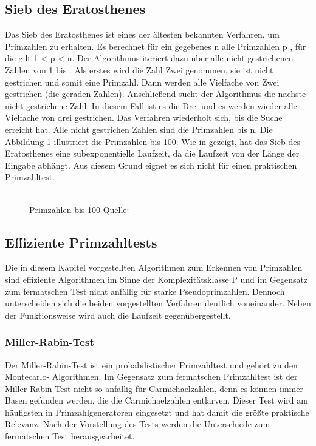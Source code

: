	\subsection{Sieb des Eratosthenes}
	Das Sieb des Eratosthenes ist eines der ältesten bekannten Verfahren, um Primzahlen zu erhalten. Es berechnet für ein gegebenes n \myin {} alle Primzahlen p \myin {}, für die gilt 1 < p < n. Der Algorithmus iteriert dazu über alle nicht gestrichenen Zahlen von 1 bis . Als erstes wird die Zahl Zwei genommen, sie ist nicht gestrichen und somit eine Primzahl. Dann werden alle Vielfache von Zwei gestrichen (die geraden Zahlen). Anschließend sucht der Algorithmus die nächste nicht gestrichene Zahl. In diesem Fall ist es die Drei und es werden wieder alle Vielfache von drei gestrichen. Das Verfahren wiederholt sich, bis die Suche  erreicht hat. Alle nicht gestrichen Zahlen sind die Primzahlen bis n. Die Abbildung \ref{ABBILDUNG_Primzahlen_100} illustriert die Primzahlen bis 100.
	Wie in \cite{Algebraische:und:zahlentheoretische:Grundlagen:fuer:die:Informatik} gezeigt, hat das Sieb des Eratosthenes eine subexponentielle Laufzeit, da die Laufzeit von der Länge der Eingabe abhängt. Aus diesem Grund eignet es sich nicht für einen praktischen Primzahltest.
	\\
	\\
	\begin{figure}
		\centering
		\caption{Primzahlen bis 100 Quelle: \cite{Mathe:Lexikon:SiebDesEratosthenes}}
		\label{ABBILDUNG_Primzahlen_100}
	\end{figure}
	
	\subsection{Effiziente Primzahltests} \label{Effiziente Primzahltests}
		Die in diesem Kapitel vorgestellten Algorithmen zum Erkennen von Primzahlen sind effiziente Algorithmen im Sinne der Komplexitätsklasse P und im Gegensatz zum fermatschen Test nicht anfällig für starke Pseudoprimzahlen. Dennoch unterscheiden sich die beiden vorgestellten Verfahren deutlich voneinander. Neben der Funktionsweise wird auch die Laufzeit gegenübergestellt.
		
		\subsubsection{Miller-Rabin-Test}
		 Der Miller-Rabin-Test ist ein probabilistischer Primzahltest und gehört zu den Montecarlo- Algorithmen. Im Gegensatz zum fermatschen Primzahltest ist der Miller-Rabin-Test nicht so anfällig für Carmichaelzahlen, denn es können immer Basen gefunden werden, die die Carmichaelzahlen entlarven. Dieser Test wird am häufigsten in Primzahlgeneratoren eingesetzt und hat damit die größte praktische Relevanz. Nach der Vorstellung des Tests werden die Unterschiede zum fermatschen Test herausgearbeitet.
		 
